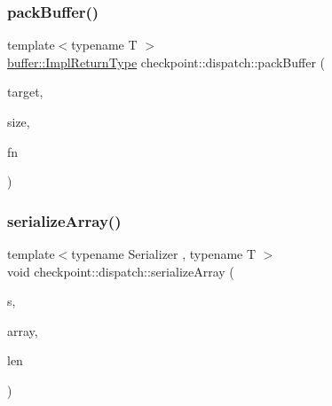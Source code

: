 \subsubsection{\texorpdfstring{pack\+Buffer()}{packBuffer()}}
{\footnotesize\ttfamily template$<$typename T $>$ \\
\hyperlink{namespacecheckpoint_1_1buffer_a4e930737a23dabd17333a8ea48c8edff}{buffer\+::\+Impl\+Return\+Type} checkpoint\+::dispatch\+::pack\+Buffer (\begin{DoxyParamCaption}\item[{T \&}]{target,  }\item[{\hyperlink{namespacecheckpoint_a083f6674da3f94c2901b18c6d238217c}{Serial\+Size\+Type}}]{size,  }\item[{\hyperlink{namespacecheckpoint_a8a2558a1dd0db386339dd81c193b7f10}{Buffer\+Obtain\+Fn\+Type}}]{fn }\end{DoxyParamCaption})}

\mbox{\label{namespacecheckpoint_1_1dispatch_a055fa8c0078dbd129325b1038079d87d}} 
\subsubsection{\texorpdfstring{serialize\+Array()}{serializeArray()}}
{\footnotesize\ttfamily template$<$typename Serializer , typename T $>$ \\
void checkpoint\+::dispatch\+::serialize\+Array (\begin{DoxyParamCaption}\item[{\hyperlink{structcheckpoint_1_1_serializer}{Serializer} \&}]{s,  }\item[{T $\ast$}]{array,  }\item[{\hyperlink{namespacecheckpoint_a083f6674da3f94c2901b18c6d238217c}{Serial\+Size\+Type} const}]{len }\end{DoxyParamCaption})\hspace{0.3cm}{\ttfamily [inline]}}

\mbox{\label{namespacecheckpoint_1_1dispatch_a721d20cfc6479ca5e029671a56915adc}} 
